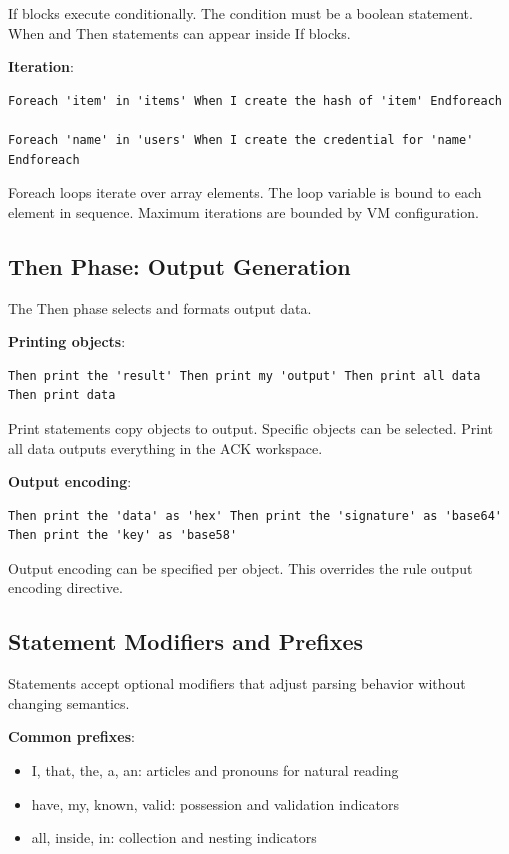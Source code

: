 If blocks execute conditionally. The condition must be a boolean
statement. When and Then statements can appear inside If blocks.

\textbf{Iteration}:

\begin{verbatim}
Foreach 'item' in 'items' When I create the hash of 'item' Endforeach

Foreach 'name' in 'users' When I create the credential for 'name'
Endforeach
\end{verbatim}

Foreach loops iterate over array elements. The loop variable is bound
to each element in sequence. Maximum iterations are bounded by VM
configuration.

\subsection{Then Phase: Output Generation}

The Then phase selects and formats output data.

\textbf{Printing objects}:

\begin{verbatim}
Then print the 'result' Then print my 'output' Then print all data
Then print data
\end{verbatim}

Print statements copy objects to output. Specific objects can be
selected. Print all data outputs everything in the ACK workspace.

\textbf{Output encoding}:

\begin{verbatim}
Then print the 'data' as 'hex' Then print the 'signature' as 'base64'
Then print the 'key' as 'base58'
\end{verbatim}

Output encoding can be specified per object. This overrides the rule
output encoding directive.

\subsection{Statement Modifiers and Prefixes}

Statements accept optional modifiers that adjust parsing behavior
without changing semantics.

\textbf{Common prefixes}:

\begin{itemize}
\item I, that, the, a, an: articles and pronouns for natural reading
\item have, my, known, valid: possession and validation indicators
\item all, inside, in: collection and nesting indicators
\end{itemize}


